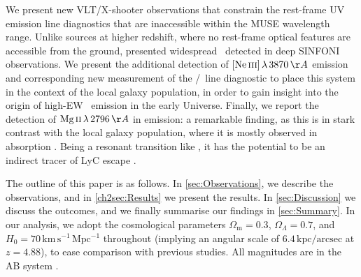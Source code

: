 We present new VLT/X-shooter observations that constrain the rest-frame UV emission line diagnostics that are inaccessible within the MUSE wavelength range. Unlike sources at higher redshift, where no rest-frame optical features are accessible from the ground, \citet{2007MNRAS.376..479S} presented widespread \OII\ detected in deep SINFONI observations. We present the additional detection of $\NeIII \, \lambda \, 3870 \, \Angstrom$ emission and corresponding new measurement of the \NeIII/\OII\ line diagnostic to place this system in the context of the local galaxy population, in order to gain insight into the origin of high-EW \CIV\ emission in the early Universe. Finally, we report the detection of $\MgII \, \lambda \, 2796 \, \Angstrom$ in emission: a remarkable finding, as this is in stark contrast with the local galaxy population, where it is mostly observed in absorption \citep[e.g.][]{1993ApJS...86....5K}. Being a resonant transition like \lya, it has the potential to be an indirect tracer of LyC escape \citep[e.g.][]{2018ApJ...855...96H}.

The outline of this paper is as follows. In \cref{sec:Observations}, we describe the observations, and in \cref{ch2sec:Results} we present the results. In \cref{sec:Discussion} we discuss the outcomes, and we finally summarise our findings in \cref{sec:Summary}. In our analysis, we adopt the cosmological parameters $\Omega_\text{m} = 0.3$, $\Omega_\Lambda = 0.7$, and $H_0 = 70 \, \mathrm{km \, s^{-1} \, Mpc^{-1}}$ throughout (implying an angular scale of $6.4 \, \mathrm{kpc/arcsec}$ at $z=4.88$), to ease comparison with previous studies. All magnitudes are in the AB system \citep{1983ApJ...266..713O}.


